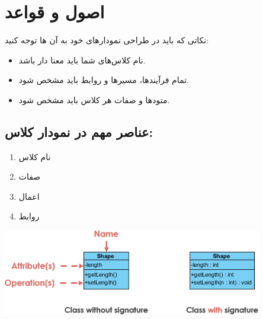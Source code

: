 \documentclass[]{article}
\begin{document}
\section*{{\titr اصول و قواعد }}

نکاتی که باید در طراحی نمودارهای خود به آن ها توجه کنید:

\begin{itemize}

\item
نام کلاس‌های شما باید معنا دار باشد.

\item
تمام فرآیندها، مسیرها و روابط باید مشخص شود.

\item
متودها و صفات هر کلاس باید مشخص شود.



\end{itemize}


\subsection*{{\titr عناصر مهم در نمودار کلاس:}}

\begin{enumerate}

\item

نام کلاس

\item
صفات

\item
اعمال

\item
روابط

\end{enumerate}


\begin{center}

\includegraphics[width=0.85\textwidth]{images/image11.png}

\end{center}
\end{document}
